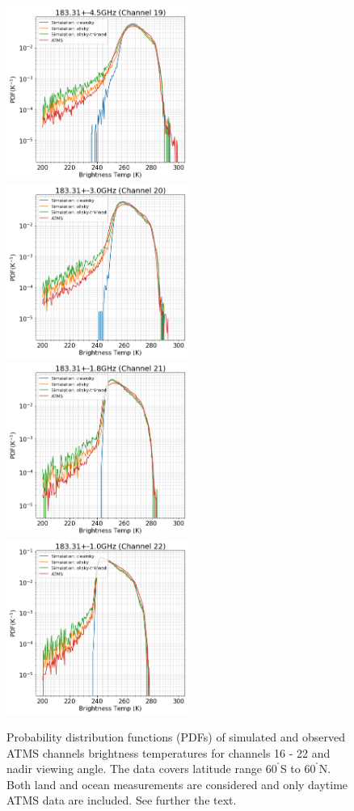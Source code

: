 \documentclass[12pt]{article}
\newcommand{\degree}{\ensuremath{\mathrm{^\circ}}}
\begin{document}
\begin{figure}[p]
	\includegraphics[height=57mm]{ATMS_C19_distribution}
	\includegraphics[height=57mm]{ATMS_C20_distribution}\hspace{5mm}%
	\includegraphics[height=57mm]{ATMS_C21_distribution}
	\includegraphics[height=57mm]{ATMS_C22_distribution}
	\caption{Probability distribution functions (PDFs) of simulated and
      observed ATMS channels brightness temperatures for channels 16 - 22 and
      nadir viewing angle. The data covers latitude range $60^{\degree}$S to
      $60^{\degree}$N. Both land and ocean measurements are considered and only
      daytime ATMS data are included. See further the text.}
	\label{fig:pdf:c16-22}

\end{figure}
\end{document}

